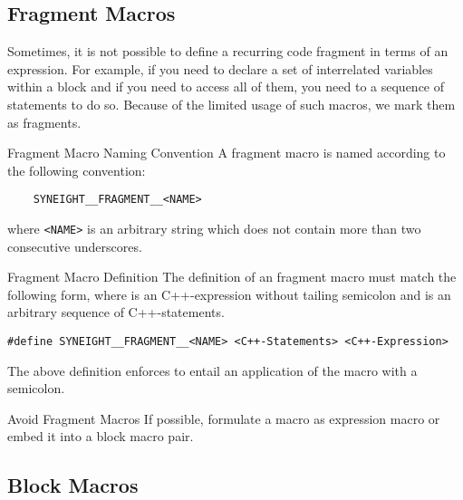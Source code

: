 \subsection{Fragment Macros}
\label{sec:fragment-macros}

Sometimes, it is not possible to define a recurring code fragment in
terms of an expression. For example, if you need to declare a set of
interrelated variables within a block and if you need to access all of
them, you need to a sequence of statements to do so. Because of the
limited usage of such macros, we mark them as fragments.

\begin{rule*}{Fragment Macro Naming Convention}
  A fragment macro is named according to the following convention:
  \begin{verbatim}
    SYNEIGHT__FRAGMENT__<NAME>
  \end{verbatim}
  where {\tt <NAME>} is an arbitrary string which does not contain
  more than two consecutive underscores.
\end{rule*}

\begin{rule*}{Fragment Macro Definition}
  The definition of an fragment macro must match the
  following form, where {\tt <C++-Expression>} is an C++-expression
  without tailing semicolon and {\tt <C++-Statements>} is an arbitrary
  sequence of C++-statements.
\begin{verbatim}
#define SYNEIGHT__FRAGMENT__<NAME> <C++-Statements> <C++-Expression>
\end{verbatim}
\end{rule*}
%
The above definition enforces to entail an application of the macro
with a semicolon.

\begin{guideline*}{Avoid Fragment Macros}
  If possible, formulate a macro as expression macro or embed it into
  a block macro pair.
\end{guideline*}


\subsection{Block Macros}
\label{sec:block-macros}

